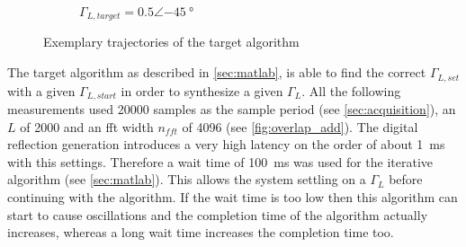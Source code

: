 \documentclass[12pt,a4paper,parskip=full,abstract=true,BCOR=10mm,twoside,open=right]{scrreprt}
\begin{document}
\begin{figure}[htb]
\begin{subfigure}[b]{.5\linewidth}
        \caption{$\Gamma_{L,target} = 0.5 \angle \SI{-45}{\degree}$}
        \label{fig:find_target_bad}
    \end{subfigure}
    \caption{Exemplary trajectories of the target algorithm}
    \label{fig:find_target}
\end{figure}

The target algorithm as described in \cref{sec:matlab}, is able to find the
correct $\Gamma_{L,set}$ with a given $\Gamma_{L,start}$ in order to synthesize
a given $\Gamma_L$. All the following measurements used 20000 samples as the
sample period (see \cref{sec:acquisition}), an $L$ of 2000 and an \gls{fft} width $n_{fft}$
of 4096 (see \cref{fig:overlap_add}). The digital reflection generation introduces
a very high latency on the order of about \SI{1}{\milli\second} with this settings.
Therefore a wait time of \SI{100}{\milli\second} was used for the iterative algorithm
(see \cref{sec:matlab}). This allows the system settling on a $\Gamma_L$ before continuing
with the algorithm. If the wait time is too low then this algorithm can start to
cause oscillations and the completion time of the algorithm actually increases, whereas
a long wait time increases the completion time too.
\end{document}
